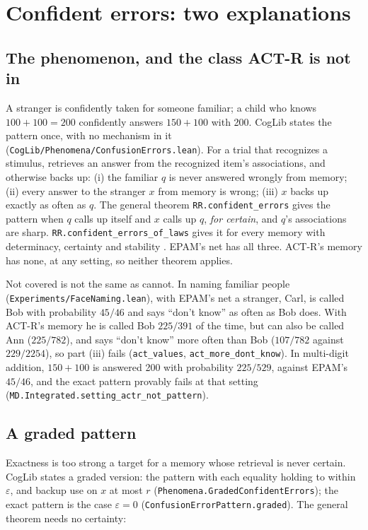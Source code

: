 \documentclass[11pt]{article}
\newcommand{\code}[1]{\texttt{#1}}
\newcommand{\lean}[1]{\texttt{#1}}
\begin{document}
\section{Confident errors: two explanations}
\label{sec:ce}

\subsection{The phenomenon, and the class ACT-R is not in}

A stranger is confidently taken for someone familiar; a child who knows $100+100=200$ confidently answers $150+100$ with 200. CogLib states the pattern once, with no mechanism in it (\code{CogLib/Phenomena/ConfusionErrors.lean}). For a trial that recognizes a stimulus, retrieves an answer from the recognized item's associations, and otherwise backs up: (i) the familiar $q$ is never answered wrongly from memory; (ii) every answer to the stranger $x$ from memory is wrong; (iii) $x$ backs up exactly as often as $q$. The general theorem \lean{RR.confident\_errors} gives the pattern when $q$ calls up itself and $x$ calls up $q$, \emph{for certain}, and $q$'s associations are sharp. \lean{RR.confident\_errors\_of\_laws} gives it for every memory with determinacy, certainty and stability \citep{shrager2026coglean}. EPAM's net has all three. ACT-R's memory has none, at any setting, so neither theorem applies.

Not covered is not the same as cannot. In naming familiar people (\code{Experiments/FaceNaming.lean}), with EPAM's net a stranger, Carl, is called Bob with probability $45/46$ and says ``don't know'' as often as Bob does. With ACT-R's memory he is called Bob $225/391$ of the time, but can also be called Ann ($225/782$), and says ``don't know'' more often than Bob ($107/782$ against $229/2254$), so part (iii) fails (\lean{act\_values}, \lean{act\_more\_dont\_know}). In multi-digit addition, $150+100$ is answered 200 with probability $225/529$, against EPAM's $45/46$, and the exact pattern provably fails at that setting (\lean{MD.Integrated.setting\_actr\_not\_pattern}).

\subsection{A graded pattern}

Exactness is too strong a target for a memory whose retrieval is never certain. CogLib states a graded version: the pattern with each equality holding to within $\varepsilon$, and backup use on $x$ at most $r$ (\lean{Phenomena.GradedConfidentErrors}); the exact pattern is the case $\varepsilon = 0$ (\lean{ConfusionErrorPattern.graded}). The general theorem needs no certainty:
\end{document}
